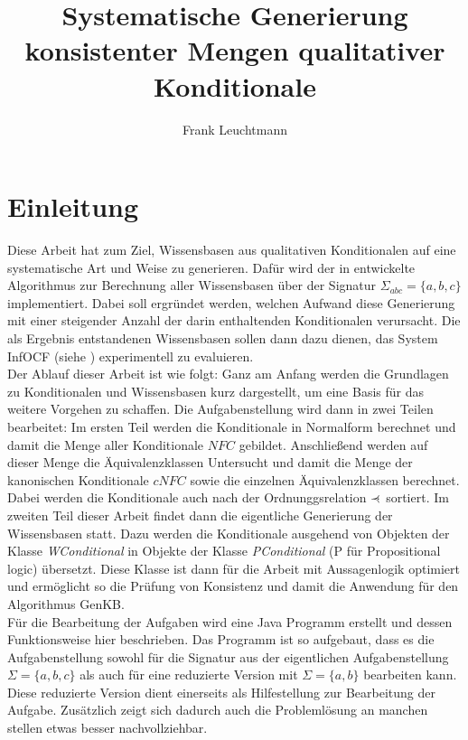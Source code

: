 \documentclass[12pt,a4paper]{article}
\author{Frank Leuchtmann}
\title{Systematische Generierung konsistenter Mengen qualitativer
Konditionale}
\newcommand\rdotl{\mathrel{%
    \mathchoice{\RQEQ}{\RQEQ}{\RQEQ}{\RQEQ}%
}}
\def\RQEQ{{%
    \setbox0\hbox{$\prec$}%
    \rlap{\hbox to \wd0{\hss \raisebox {0.01pt}{$\ \cdot$\hss}}}\box0
}}
\begin{document}
\maketitle
\newpage
\tableofcontents
\newpage
\section{Einleitung}
Diese Arbeit hat zum Ziel, Wissensbasen aus qualitativen Konditionalen auf eine systematische Art und Weise zu generieren. Dafür wird der in \cite{beierle19} entwickelte Algorithmus zur Berechnung aller Wissensbasen über der Signatur $\Sigma_{abc}= \{a,b,c\}$ implementiert. Dabei soll ergründet werden, welchen Aufwand diese Generierung mit einer steigender Anzahl der darin  enthaltenden Konditionalen verursacht. Die als Ergebnis entstandenen Wissensbasen sollen dann dazu dienen, das System InfOCF (siehe \cite{beierle17}) experimentell zu evaluieren. \\
Der Ablauf dieser Arbeit ist wie folgt: Ganz am Anfang werden die Grundlagen zu Konditionalen und Wissensbasen kurz dargestellt, um eine Basis für das weitere Vorgehen zu schaffen. Die Aufgabenstellung wird dann in zwei Teilen bearbeitet: Im ersten Teil werden die Konditionale in Normalform berechnet und damit die Menge aller Konditionale $NFC$ gebildet. Anschließend werden auf dieser Menge die Äquivalenzklassen Untersucht und damit die Menge der kanonischen Konditionale $cNFC$ sowie die einzelnen Äquivalenzklassen berechnet. Dabei werden die Konditionale auch nach der Ordnunggsrelation $\rdotl$ sortiert. Im zweiten Teil dieser Arbeit findet dann die eigentliche Generierung der Wissensbasen statt. Dazu werden die Konditionale ausgehend von Objekten der Klasse \textit{WConditional} in Objekte der Klasse \textit{PConditional} (P für Propositional logic) übersetzt. Diese Klasse ist dann für die Arbeit mit Aussagenlogik optimiert und ermöglicht so die Prüfung von Konsistenz und damit die Anwendung für den Algorithmus GenKB. \\
Für die Bearbeitung der Aufgaben wird eine Java Programm erstellt und dessen Funktionsweise hier beschrieben. Das Programm ist so aufgebaut, dass es die Aufgabenstellung sowohl für die Signatur aus der eigentlichen Aufgabenstellung $\Sigma = \{a,b,c\}$ als auch für eine reduzierte Version mit $\Sigma = \{a,b\}$ bearbeiten kann. Diese reduzierte Version dient einerseits als Hilfestellung zur Bearbeitung der Aufgabe. Zusätzlich zeigt sich dadurch auch die Problemlösung an manchen stellen etwas besser nachvollziehbar.
\end{document}
